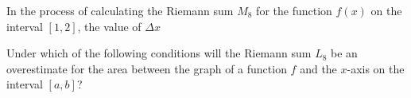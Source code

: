 \documentclass[addpoints]{exam}
\begin{document}
\begin{questions}
	
\question[2] In the process of calculating the Riemann sum $M_{8}$ for the function $f(x)$ on the interval $[1,2]$, the value of $\Delta x$
	
\question[2] Under which of the following conditions will the Riemann sum $L_8$ be an overestimate for the area between the graph of a function $f$ and the $x$-axis on the interval $[a,b]$? 
\end{questions}
\end{document}
